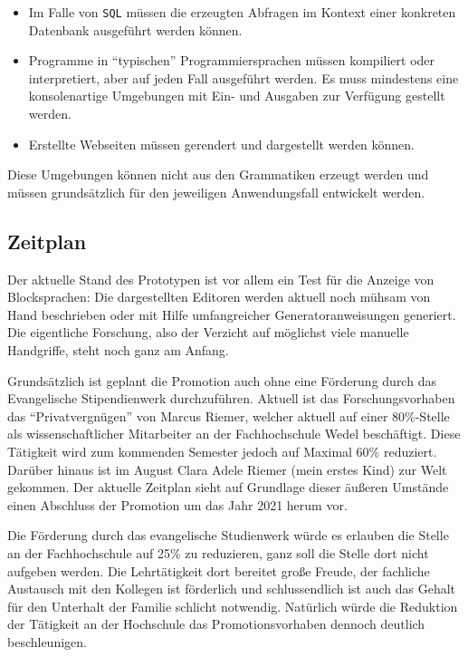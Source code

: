 \documentclass[paper=a4,fontsize=12pt,parskip=half]{scrartcl}
\begin{document}
\begin{itemize}
\item Im Falle von \texttt{SQL} müssen die erzeugten Abfragen im Kontext einer konkreten Datenbank ausgeführt werden können.
\item Programme in \enquote{typischen} Programmiersprachen müssen kompiliert oder interpretiert, aber auf jeden Fall ausgeführt werden. Es muss mindestens eine konsolenartige Umgebungen mit Ein- und Ausgaben zur Verfügung gestellt werden.
\item Erstellte Webseiten müssen gerendert und dargestellt werden können.
\end{itemize}

Diese Umgebungen können nicht aus den Grammatiken erzeugt werden und müssen grundsätzlich für den jeweiligen Anwendungsfall entwickelt werden.

\subsection{Zeitplan}

Der aktuelle Stand des Prototypen ist vor allem ein Test für die Anzeige von Blocksprachen: Die dargestellten Editoren werden aktuell noch mühsam von Hand beschrieben oder mit Hilfe umfangreicher Generatoranweisungen generiert. Die eigentliche Forschung, also der Verzicht auf möglichst viele manuelle Handgriffe, steht noch ganz am Anfang.

Grundsätzlich ist geplant die Promotion auch ohne eine Förderung durch das Evangelische Stipendienwerk durchzuführen. Aktuell ist das Forschungsvorhaben das \enquote{Privatvergnügen} von Marcus Riemer, welcher aktuell auf einer 80\%-Stelle als wissenschaftlicher Mitarbeiter an der Fachhochschule Wedel beschäftigt. Diese Tätigkeit wird zum kommenden Semester jedoch auf Maximal 60\% reduziert. Darüber hinaus ist im August Clara Adele Riemer (mein erstes Kind) zur Welt gekommen. Der aktuelle Zeitplan sieht auf Grundlage dieser äußeren Umstände einen Abschluss der Promotion um das Jahr 2021 herum vor.

Die Förderung durch das evangelische Studienwerk würde es erlauben die Stelle an der Fachhochschule auf 25\% zu reduzieren, ganz soll die Stelle dort nicht aufgeben werden. Die Lehrtätigkeit dort bereitet große Freude, der fachliche Austausch mit den Kollegen ist förderlich und schlussendlich ist auch das Gehalt für den Unterhalt der Familie schlicht notwendig. Natürlich würde die Reduktion der Tätigkeit an der Hochschule das Promotionsvorhaben dennoch deutlich beschleunigen.
\end{document}
